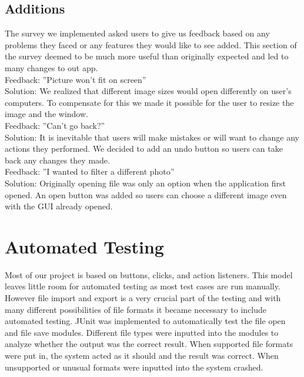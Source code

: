 \documentclass[12pt, titlepage]{article}
\begin{document}
\subsection{Additions}
The survey we implemented asked users to give us feedback based on any problems they faced or any features they would like to see added. This section of the survey deemed to be much more useful than originally expected and led to many changes to out app.\\

\noindent Feedback: ''Picture won’t fit on screen''\\
Solution: We realized that different image sizes would open differently on user’s computers. To compensate for this we made it possible for the user to resize the image and the window.\\

\noindent Feedback: ''Can’t go back?''\\
Solution: It is inevitable that users will make mistakes or will want to change any actions they performed. We decided to add an undo button so users can take back any changes they made.\\

\noindent Feedback: ''I wanted to filter a different photo''\\
Solution: Originally opening file was only an option when the application first opened. An open button was added so users can choose a different image even with the GUI already opened.\\

\section{Automated Testing}
Most of our project is based on buttons, clicks, and action listeners. This model leaves little room for automated testing as most test cases are run manually. However file import and export is a very crucial part of the testing and with many different possibilities of file formats it became necessary to include automated testing. JUnit was implemented to automatically test the file open and file save modules. Different file types were inputted into the modules to analyze whether the output was the correct result. When supported file formats were put in, the system acted as it should and the result was correct. When unsupported or unusual formats were inputted into the system crashed.
\end{document}
